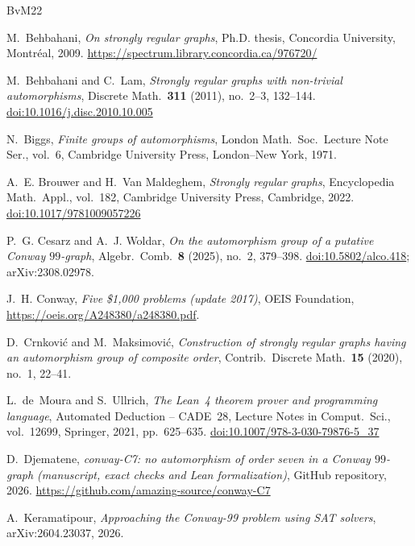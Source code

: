 \documentclass[11pt,a4paper]{amsart}
\theoremstyle{definition}
\theoremstyle{remark}
\begin{document}
\begin{thebibliography}{BvM22}

 M.~Behbahani, \emph{On strongly regular graphs}, Ph.D. thesis, Concordia University,
Montréal, 2009. \url{https://spectrum.library.concordia.ca/976720/}

 M.~Behbahani and C.~Lam, \emph{Strongly regular graphs with non-trivial automorphisms},
Discrete Math.\ \textbf{311} (2011), no.~2--3, 132--144.
\href{https://doi.org/10.1016/j.disc.2010.10.005}{doi:10.1016/j.disc.2010.10.005}

 N.~Biggs, \emph{Finite groups of automorphisms}, London Math.\ Soc.\ Lecture Note Ser.,
vol.~6, Cambridge University Press, London--New York, 1971.

 A.~E. Brouwer and H.~Van Maldeghem, \emph{Strongly regular graphs}, Encyclopedia Math.\
Appl., vol.~182, Cambridge University Press, Cambridge, 2022.
\href{https://doi.org/10.1017/9781009057226}{doi:10.1017/9781009057226}

 P.~G. Cesarz and A.~J. Woldar, \emph{On the automorphism group of a putative Conway
$99$-graph}, Algebr.\ Comb.\ \textbf{8} (2025), no.~2, 379--398.
\href{https://doi.org/10.5802/alco.418}{doi:10.5802/alco.418}; arXiv:2308.02978.

 J.~H. Conway, \emph{Five \$1{,}000 problems (update 2017)}, OEIS Foundation,
\url{https://oeis.org/A248380/a248380.pdf}.

 D.~Crnković and M.~Maksimović, \emph{Construction of strongly regular graphs having an
automorphism group of composite order}, Contrib.\ Discrete Math.\ \textbf{15} (2020), no.~1, 22--41.

 L.~de~Moura and S.~Ullrich, \emph{The Lean~4 theorem prover and programming language},
Automated Deduction -- CADE~28, Lecture Notes in Comput.\ Sci., vol.~12699, Springer, 2021, pp.~625--635.
\href{https://doi.org/10.1007/978-3-030-79876-5_37}{doi:10.1007/978-3-030-79876-5\_37}

 D.~Djematene, \emph{conway-C7: no automorphism of order seven in a Conway $99$-graph (manuscript, exact checks and Lean formalization)}, GitHub repository, 2026. \url{https://github.com/amazing-source/conway-C7}

 A.~Keramatipour, \emph{Approaching the Conway-99 problem using SAT solvers},
arXiv:2604.23037, 2026.


\end{thebibliography}
\end{document}
